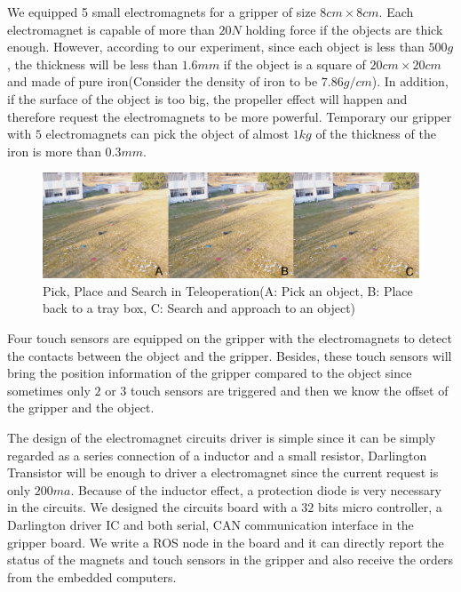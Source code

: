 \documentclass{standalone}
\begin{document}
We equipped 5 small electromagnets for a gripper of size $8cm \times 8cm$. Each electromagnet is capable of more than $20N$ holding force if the objects are thick enough. However, according to our experiment, since each object is less than $500g$, the thickness will be less than $1.6mm$ if the object is a square of $20cm \times 20cm$ and made of pure iron(Consider the density of iron to be $7.86g/cm$). In addition, if the surface of the object is too big, the propeller effect will happen and therefore request the electromagnets to be more powerful. Temporary our gripper with $5$ electromagnets can pick the object of almost $1kg$ of the thickness of the iron is more than $0.3mm$. 
 \begin{figure}%
    \begin{center}
    \includegraphics[keepaspectratio=true, width=1\linewidth, height=0.3\textheight]
    {sections//task3//images//teleop.png}
      \end{center}
    \caption{Pick, Place and Search in Teleoperation(A: Pick an object, B: Place back to a tray box, C: Search and approach to an object)}
    \label{task3tele}
    \end{figure}

Four touch sensors are equipped on the gripper with the electromagnets to detect the contacts between the object and the gripper. Besides, these touch sensors will bring the position information of the gripper compared to the object since sometimes only $2$ or $3$ touch sensors are triggered and then we know the offset of the gripper and the object. 
    
The design of the electromagnet circuits driver is simple since it can be simply regarded as a series connection of a inductor and a small resistor, Darlington Transistor will be enough to driver a electromagnet since the current request is only $200ma$. Because of the inductor effect, a protection diode is very necessary in the circuits. We designed the circuits board with a $32$ bits micro controller, a Darlington driver IC and both serial, CAN communication interface in the gripper board. We write a ROS node in the board and it can directly report the status of the magnets and touch sensors in the gripper and also receive the orders from the embedded computers. 
\end{document}
